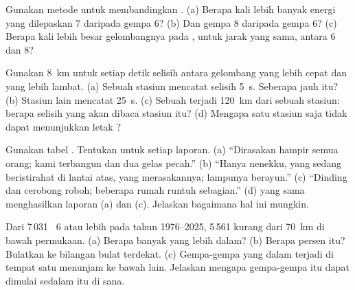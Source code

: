 \begin{exercise}[$\star\star$]\label{exo:g7:earthquakes:6}
Gunakan metode untuk membandingkan . (a) Berapa kali lebih banyak
energi yang dilepaskan   7 daripada gempa
 6? (b) Dan gempa  8 daripada gempa  6?
(c) Berapa kali lebih besar gelombangnya pada , untuk jarak yang
sama, antara  6 dan 8?
\end{exercise}

\begin{exercise}[$\star\star$]\label{exo:g7:earthquakes:7}
Gunakan \qty{8}{km} untuk setiap detik selisih antara gelombang yang lebih
cepat dan yang lebih lambat. (a) Sebuah stasiun mencatat selisih
\qty{5}{s}. Seberapa jauh  itu? (b) Stasiun lain mencatat
\qty{25}{s}. (c) Sebuah  terjadi \qty{120}{km} dari sebuah
stasiun: berapa selisih yang akan dibaca stasiun itu? (d) Mengapa satu
stasiun saja tidak dapat menunjukkan letak ?
\end{exercise}

\begin{exercise}[$\star\star$]\label{exo:g7:earthquakes:8}
Gunakan tabel . Tentukan  untuk setiap laporan.
(a) ``Dirasakan hampir semua orang; kami terbangun dan dua gelas pecah.''
(b) ``Hanya nenekku, yang sedang beristirahat di lantai atas, yang
merasakannya; lampunya berayun.'' (c) ``Dinding dan cerobong roboh;
beberapa rumah runtuh sebagian.'' (d)  yang sama menghasilkan
laporan (a) dan (c). Jelaskan bagaimana hal ini mungkin.
\end{exercise}

\begin{exercise}[$\star\star$]\label{exo:g7:earthquakes:9}
Dari 7\,031  ~6 atau lebih pada tahun 1976--2025,
5\,561  kurang dari \qty{70}{km} di bawah permukaan.
(a) Berapa banyak yang  lebih dalam? (b) Berapa persen itu?
Bulatkan ke bilangan bulat terdekat. (c) Gempa-gempa yang dalam terjadi di
tempat satu  menunjam ke bawah  lain. Jelaskan mengapa
gempa-gempa itu dapat dimulai sedalam itu di sana.
\end{exercise}

